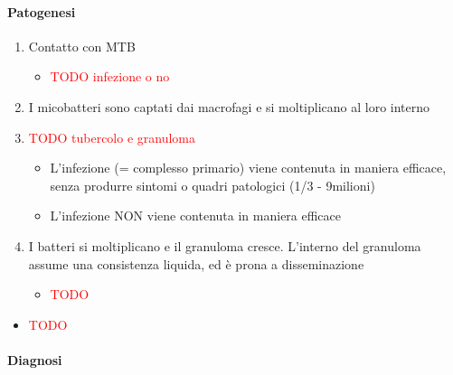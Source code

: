 \documentclass[italian,]{article}
\providecommand{\tightlist}{%
  \setlength{\itemsep}{0pt}\setlength{\parskip}{0pt}}
\newcommand{\TODO}[1]{\textcolor{red}{\textsf{\footnotesize{TODO #1}}}} %
\begin{document}
\hypertarget{patogenesi-2}{%
\paragraph{Patogenesi}\label{patogenesi-2}}

\begin{enumerate}
\def\labelenumi{\arabic{enumi}.}
\setcounter{enumi}{-1}
\item
  Contatto con MTB

  \begin{itemize}
  \item
    \TODO{infezione o no}
  \end{itemize}
\item
  I micobatteri sono captati dai macrofagi e si moltiplicano al loro
  interno
\item
  \TODO{tubercolo e granuloma}

  \begin{itemize}
  \tightlist
  \item
    L'infezione (= complesso primario) viene contenuta in maniera
    efficace, senza produrre sintomi o quadri patologici (1/3 -
    9milioni)
  \item
    L'infezione NON viene contenuta in maniera efficace
  \end{itemize}
\item
  I batteri si moltiplicano e il granuloma cresce. L'interno del
  granuloma assume una consistenza liquida, ed è prona a disseminazione

  \begin{itemize}
  \item
    \TODO{}
  \end{itemize}
\end{enumerate}

\begin{itemize}
\item
  \TODO{}
\end{itemize}

\hypertarget{diagnosi-6}{%
\paragraph{Diagnosi}\label{diagnosi-6}}
\end{document}
